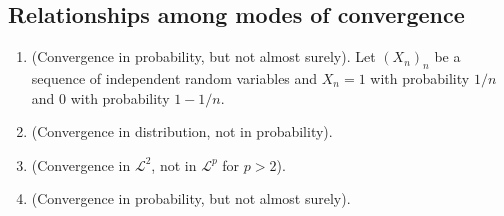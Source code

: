 \documentclass[a4paper,10pt]{article}
\begin{document}
\subsection{Relationships among modes of convergence}
\begin{enumerate}
 \item (Convergence in probability, but not almost surely). 
       Let $(X_n)_n$ be a sequence of independent random variables and $X_n=1$ with probability $1/n$
       and $0$ with probability $1-1/n$.
 \item (Convergence in distribution, not in probability).
 \item (Convergence in $\mathcal{L}^2$, not in $\mathcal{L}^p$ for $p>2$).
 \item (Convergence in probability, but not almost surely).
\end{enumerate}
\end{document}
